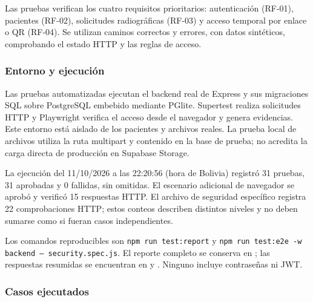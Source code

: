 Las pruebas verifican los cuatro requisitos prioritarios: autenticación
(RF-01), pacientes (RF-02), solicitudes radiográficas (RF-03) y acceso
temporal por enlace o QR (RF-04). Se utilizan caminos correctos y errores,
con datos sintéticos, comprobando el estado HTTP y las reglas de acceso.

\subsubsection{Entorno y ejecución}

Las pruebas automatizadas ejecutan el backend real de Express y sus
migraciones SQL sobre PostgreSQL embebido mediante PGlite. Supertest realiza
solicitudes HTTP y Playwright verifica el acceso desde el navegador y genera
evidencias. Este entorno está aislado de los pacientes y archivos reales.
La prueba local de archivos utiliza la ruta multipart y contenido en la base
de prueba; no acredita la carga directa de producción en Supabase Storage.

La ejecución del 11/10/2026 a las 22:20:56 (hora de Bolivia)
registró 31 pruebas, 31 aprobadas y 0 fallidas, sin omitidas.
El escenario adicional de navegador se aprobó y verificó 15
respuestas HTTP. El archivo de seguridad específico registra 22
comprobaciones HTTP; estos conteos describen distintos niveles y no deben sumarse
como si fueran casos independientes.

Los comandos reproducibles son \texttt{npm run test:report} y
\texttt{npm run test:e2e -w backend -- security.spec.js}.
El reporte completo se conserva en
; las respuestas resumidas se encuentran
en  y
. Ninguno incluye contraseñas ni JWT.

\subsubsection{Casos ejecutados}

